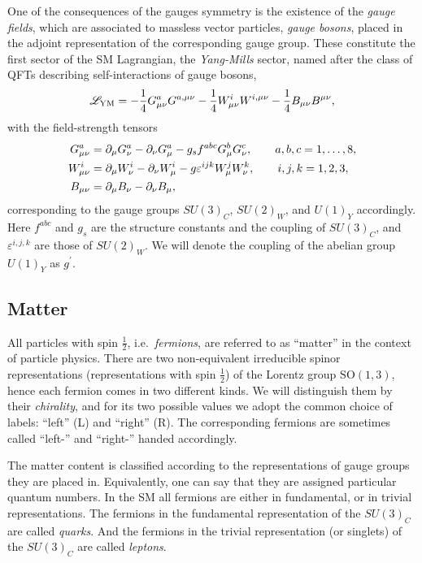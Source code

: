 One of the consequences of the gauges symmetry is the existence of the \emph{gauge fields}, which
are associated to massless vector particles, \emph{gauge bosons}, placed in the adjoint representation of the corresponding gauge group.
These constitute the first sector of the SM Lagrangian, the \emph{Yang-Mills} sector, named after the class of QFTs describing self-interactions
of gauge bosons,
\begin{equation}
  {\mathscr{L}}_{\text{YM}} = 
  -\frac{1}{4}G^a_{\mu\nu}G^{a,\mu\nu}
  -\frac{1}{4}W^i_{\mu\nu}W^{i,\mu\nu} 
  -\frac{1}{4} B_{\mu\nu}B^{\mu\nu},
\end{equation}
with the field-strength tensors
\begin{subequations}
  \begin{align}
    G^a_{\mu\nu} &= \partial_\mu G^a_\nu-\partial_\nu G^a_\mu 
    -g_{s} f^{abc} G^b_\mu G^c_\nu,
    \qquad a,b,c=1,\dots,8, \\
    W^i_{\mu\nu} &= 
    \partial_\mu W^i_\nu-\partial_\nu W^i_\mu -g\varepsilon^{ijk} W^j_\mu W^k_\nu,
    \qquad i,j,k=1,2,3,\\
    B_{\mu\nu} &= \partial_\mu B_\nu-\partial_\nu B_\mu,
  \end{align}
\end{subequations}
corresponding to the gauge groups $SU(3)_C$, $ SU(2)_W$,  and $ U(1)_Y$ accordingly.
Here $f^{abc}$ and $g_s$ are the structure constants and the coupling of $SU(3)_C$,
and $\varepsilon^{i,j,k}$ are those of $ SU(2)_W$. 
We will denote the coupling of the abelian group $U(1)_Y$ as $g^\prime$.

\subsection{Matter}

All particles with spin $\frac{1}{2}$, i.e.\ \emph{fermions}, are referred to as ``matter'' in the context of particle physics.
There are two non-equivalent irreducible spinor representations (representations with spin $\frac{1}{2}$) of the Lorentz group $\mathrm{SO}(1,3)$, hence
each fermion comes in two different kinds. 
We will distinguish them by their \emph{chirality}, and for its two possible values we adopt the common choice of labels: ``left'' (L) and ``right'' (R).
The corresponding fermions are sometimes called ``left-'' and ``right-'' handed accordingly.

The matter content is classified according to the representations of gauge groups they are placed in.
Equivalently, one can say that they are assigned particular quantum numbers. 
In the SM all fermions are either in fundamental, or in trivial representations.
The fermions in the fundamental representation of the $SU(3)_C$ are called \emph{quarks}.
And the fermions in the trivial representation (or singlets) of the $SU(3)_C$ are called \emph{leptons}.

